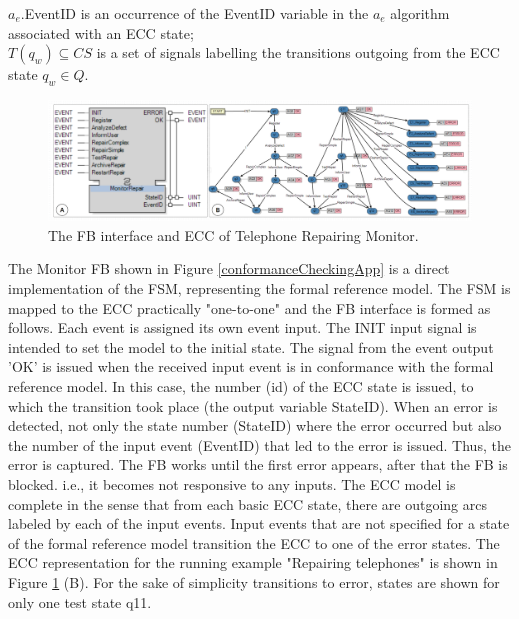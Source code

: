 \begin{bibunit}
\begin{algorithm}[t]
$a_e$.EventID is an  occurrence of the EventID variable in the $a_e$ algorithm associated with an ECC state; \\

$T(q_w) \subseteq CS$ is a set of signals labelling the transitions outgoing from the ECC state $q_w \in Q$.

\end{algorithm}

\begin{figure}[!t]
	\centering
	\includegraphics[width=1\textwidth]{MX_Papers/Paper7/images/MR.PNG}
	\caption{The FB interface and ECC of Telephone Repairing Monitor.}
	\label{TR_MonitorFB}
\end{figure}

The Monitor FB shown in Figure \ref{conformanceCheckingApp}  is a direct implementation of the FSM, representing the formal reference model. The FSM is mapped to the ECC practically "one-to-one" and the FB interface is formed as follows. Each event is assigned its own event input. The INIT input signal is intended to set the model to the initial state. The signal from the event output 'OK' is issued when the received input event is in conformance with the formal reference model. In this case, the number (id) of the ECC state is issued, to which the transition took place (the output variable StateID). When an error is detected, not only the state number (StateID) where the error occurred but also the number of the input event (EventID) that led to the error is issued. Thus, the error is captured. The FB works until the first error appears, after that the FB is blocked. i.e., it becomes not responsive to any inputs. The ECC model is complete in the sense that from each basic ECC state, there are outgoing arcs labeled by each of the input events. Input events that are not specified for a state of the formal reference model transition the ECC to one of the error states. The ECC representation for the running example "Repairing telephones" is shown in Figure \ref{TR_MonitorFB} (B). For the sake of simplicity transitions to error, states are shown for only one test state q11.




\end{bibunit}
